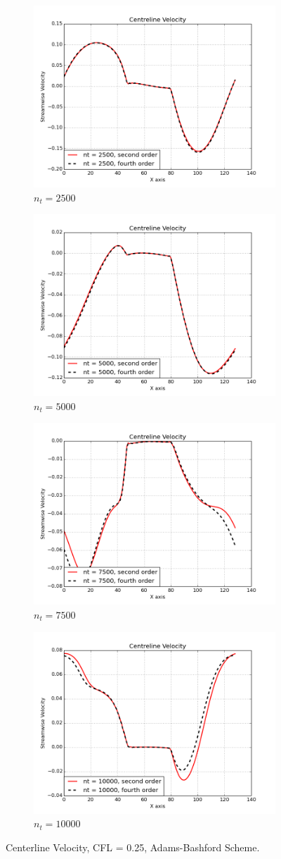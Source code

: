 \documentclass[10pt, a4paper]{article}
\begin{document}
\begin{figure}[htb!]
\centering
\begin{subfigure}{.5\textwidth}
  \centering
  \includegraphics[width=.5\linewidth, clip=true, trim=1cm 1cm 1cm 1cm]{velocity1}
  \caption{$n_t = 2500$}
\end{subfigure}%
\begin{subfigure}{.5\textwidth}
  \centering
  \includegraphics[width=.5\linewidth, clip=true, trim=1cm 1cm 1cm 1cm]{velocity2}
  \caption{$n_t = 5000$}
\end{subfigure}
\newline
\begin{subfigure}{.5\textwidth}
  \centering
  \includegraphics[width=.5\linewidth, clip=true, trim=1cm 1cm 1cm 1cm]{velocity3}
  \caption{$n_t = 7500$}
\end{subfigure}%
\begin{subfigure}{.5\textwidth}
  \centering
  \includegraphics[width=.5\linewidth, clip=true, trim=1cm 1cm 1cm 1cm]{velocity4}
  \caption{$n_t = 10000$}
\end{subfigure}
\caption{Centerline Velocity, CFL = 0.25, Adams-Bashford Scheme.}
\label{fig:q5c}
\end{figure}
\end{document}
